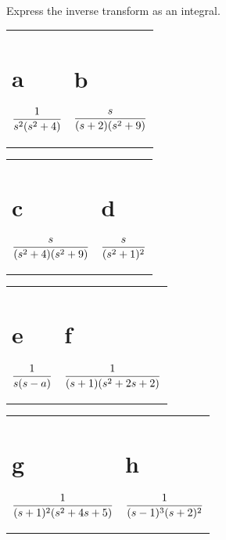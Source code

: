 \exercises

\begin{exerciselist}
  \item\label{exer:8.6.1} Express the inverse transform as an integral.

  \begin{description}
    \item
      \begin{tabular}[t]{@{}p{168pt}@{}p{168pt}}
        \part{a} $\displaystyle\frac{1}{s^{2}(s^{2}+4)}$ & \part{b} $\displaystyle\frac{s}{(s+2)(s^{2}+9)}$
      \end{tabular}

    \item
      \begin{tabular}[t]{@{}p{168pt}@{}p{168pt}}
        \part{c} $\displaystyle\frac{s}{(s^{2}+4)(s^{2}+9)}$ & \part{d} $\displaystyle\frac{s}{(s^{2}+1)^{2}}$
      \end{tabular}

    \item
      \begin{tabular}[t]{@{}p{168pt}@{}p{168pt}}
        \part{e} $\displaystyle\frac{1}{s(s-a)}$ & \part{f} $\displaystyle\frac{1}{(s+1)(s^{2}+2s+2)}$
      \end{tabular}

    \item
      \begin{tabular}[t]{@{}p{168pt}@{}p{168pt}}
        \part{g} $\displaystyle\frac{1}{(s+1)^{2}(s^{2}+4s+5)}$ & \part{h} $\displaystyle\frac{1}{(s-1)^{3}(s+2)^{2}}$
      \end{tabular}


\end{description}
\end{exerciselist}
